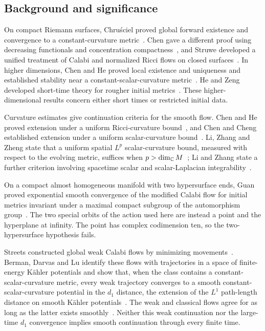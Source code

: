 \subsection{Background and significance}
On compact Riemann surfaces, Chru\'sciel proved global forward existence
and convergence to a constant-curvature metric~\cite[Theorem~2.1]{Chrusciel1991}.
Chen gave a different proof using decreasing functionals and concentration
compactness~\cite{Chen2001}, and Struwe developed a unified treatment of
Calabi and normalized Ricci flows on closed surfaces~\cite{Struwe2002}.
In higher dimensions, Chen and He proved local existence and uniqueness
and established stability near a constant-scalar-curvature
metric~\cite[Theorems~1.2 and~3.2]{ChenHe2008}. He and Zeng developed
short-time theory for rougher initial metrics~\cite{HeZeng2021}.
These higher-dimensional results concern either short times or restricted
initial data.

Curvature estimates give continuation criteria for the smooth flow.
Chen and He proved extension under a uniform Ricci-curvature
bound~\cite[Corollary~5.3]{ChenHe2008}, and Chen and Cheng established
extension under a uniform scalar-curvature bound~\cite[Theorem~1.8]{ChenCheng2021}.
Li, Zhang and Zheng state that a uniform spatial $L^p$ scalar-curvature
bound, measured with respect to the evolving metric, suffices when
$p>\dim_{\mathbb{C}}M$~\cite[Theorem~1.2]{LiZhangZheng2024}; Li and Zhang
state a further criterion involving spacetime scalar and
scalar-Laplacian integrability~\cite[Theorem~1.1]{LiZhang2025}.

On a compact almost homogeneous manifold with two hypersurface ends,
Guan proved exponential smooth convergence of the modified Calabi flow
for initial metrics invariant under a maximal compact subgroup of the
automorphism group~\cite[Theorem~A]{Guan2007}.
The two special orbits of the action used here are instead a point and
the hyperplane at infinity. The point has complex codimension ten, so
the two-hypersurface hypothesis fails.

Streets constructed global weak Calabi flows by minimizing
movements~\cite{Streets2014}. Berman, Darvas and Lu identify these flows
with trajectories in a space of finite-energy K\"ahler potentials and show
that, when the class contains a constant-scalar-curvature metric, every
weak trajectory converges to a smooth constant-scalar-curvature potential
in the $d_1$ distance, the extension of the $L^1$ path-length distance on
smooth K\"ahler potentials~\cite[Section~6 and Theorem~1.11]{BermanDarvasLu2017}.
The weak and classical flows agree for as long as the latter exists
smoothly~\cite[Proposition~6.1]{BermanDarvasLu2017}.
Neither this weak continuation nor the large-time $d_1$ convergence implies
smooth continuation through every finite time.

